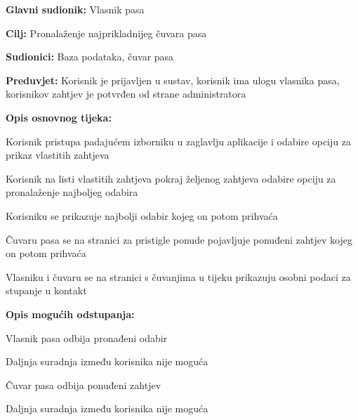 					\noindent {}
					\begin{packed_item}
						
						\item \textbf{Glavni sudionik: } Vlasnik pasa
						\item  \textbf{Cilj:} Pronalaženje najprikladnijeg čuvara pasa
						\item  \textbf{Sudionici:} Baza podataka, čuvar pasa
						\item  \textbf{Preduvjet:} Korisnik je prijavljen u sustav, korisnik ima ulogu vlasnika pasa, korisnikov zahtjev je potvrđen od strane administratora
						\item  \textbf{Opis osnovnog tijeka:}
						
						\item[] \begin{packed_enum}
							
							\item Korisnik pristupa padajućem izborniku u zaglavlju aplikacije i odabire opciju za prikaz vlastitih zahtjeva   
							\item Korisnik na listi vlastitih zahtjeva pokraj željenog zahtjeva odabire opciju za pronalaženje najboljeg odabira
							\item Korisniku se prikazuje najbolji odabir kojeg on potom prihvaća
							\item Čuvaru pasa se na stranici za pristigle ponude pojavljuje ponuđeni zahtjev kojeg on potom prihvaća
							\item Vlasniku i čuvaru se na stranici s čuvanjima u tijeku prikazuju osobni podaci za stupanje u kontakt
							
						\end{packed_enum}
					
						\item  \textbf{Opis mogućih odstupanja:}
			
							\item[] \begin{packed_item}
							\item[3.a] Vlasnik pasa odbija pronađeni odabir
							\item[] \begin{packed_enum}
			
								\item Daljnja suradnja između korisnika nije moguća
			
							\end{packed_enum}
						
							\item[4.a] Čuvar pasa odbija ponuđeni zahtjev
							\item[] \begin{packed_enum}
								
								\item Daljnja suradnja između korisnika nije moguća
								
							\end{packed_enum}
						\end{packed_item}
					\end{packed_item}	
				
